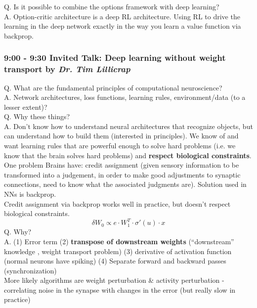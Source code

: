 \documentclass[12pt]{article}
\begin{document}
Q. Is it possible to combine the options framework with deep learning? \\

A. Option-critic architecture is a deep RL architecture. Using RL to drive the learning in the deep network exactly in the way you learn a value function via backprop.


\subsubsection{9:00 - 9:30 Invited Talk: Deep learning without weight transport by \textit{Dr. Tim Lillicrap}}

Q. What are the fundamental principles of computational neuroscience? \\

A. Network architectures, loss functions, learning rules, environment/data (to a lesser extent)? \\

Q. Why these things? \\

A. Don't know how to understand neural architectures that recognize objects, but can understand how to build them (interested in principles). We know of and want learning rules that are powerful enough to solve hard problems (i.e. we know that the brain solves hard problems) and \textbf{respect biological constraints}. \\

One problem Brains have: credit assignment (given sensory information to be transformed into a judgement, in order to make good adjustments to synaptic connections, need to know what the associated judgments are). Solution used in NNs is backprop. \\

Credit assignment via backprop works well in practice, but doesn't respect biological constraints. 
$$ 
\delta W_0 \propto e\cdot W_1^T \cdot \sigma'(u) \cdot x
$$
Q. Why? \\

A. (1) Error term (2) \textbf{transpose of downstream weights} (``downstream'' knowledge \cite{Grossberg87}, weight transport problem) (3) derivative of activation function (normal neurons have spiking) (4) Separate forward and backward passes (synchronization) \\

More likely algorithms are weight perturbation \& activity perturbation - correlating noise in the synapse with changes in the error (but really slow in practice) \\
\end{document}
